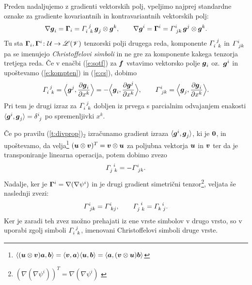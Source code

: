 Preden nadaljujemo z gradienti vektorskih polj, vpeljimo najprej standardne oznake
za gradiente kovariantnih in kontravariantnih vektorskih polj:
\begin{equation} \label{e:cs} %
	\nabla\vek{g}_i=\ten{\Gamma}_i=\cs{i}{j}{k}\,\vek{g}_j\otimes\vek{g}^k,\qquad
	\nabla\vek{g}^i=\ten{\Gamma}^i=\ks{i}{jk}\,\vek{g}^j\otimes\vek{g}^k.
\end{equation}
Tu sta $\mathbf \Gamma_i,\mathbf \Gamma^i\colon \mathcal U\to\mathscr L(\mathscr V)$ tenzorski polji drugega reda,
komponente $\cs{i}{j}{k}$ in $\ks{i}{jk}$ pa se imenujejo \emph{Christoffelovi simboli}
in ne gre za komponente kakega tenzorja tretjega reda. Če v enačbi (\ref{e:sotf})
za $\boldsymbol f$ vstavimo vektorsko polje $\boldsymbol g_i$ oz.~$\boldsymbol g^i$ in upoštevamo
(\ref{e:kompten}) in (\ref{e:cs}), dobimo
\begin{equation} \label{e:csexplicit}
	\cs{i}{j}{k}=\Big<\vek{g}^j,\frac{\partial\vek{g}_i}{\partial x^k}\Big>
	=-\Big<\vek{g}_i,\frac{\partial\vek{g}^j}{\partial x^k}\Big>,\qquad
	\ks{i}{jk}=\Big<\vek{g}_j,\frac{\partial\vek{g}_i}{\partial x^k}\Big>.
\end{equation}
Pri tem je drugi izraz za $\cs{i}{j}{k}$ dobljen iz prvega s parcialnim odvajanjem
enakosti $\langle\vek{g}^i,\vek{g}_j\rangle=\topbot{\delta}{i}{j}$ po spremenljivki $x^k$.

Če po pravilu (\ref{t:divprop})$_2$ izračunamo gradient izraza $\langle\boldsymbol g^i,\boldsymbol g_j\rangle$,
ki je $\boldsymbol 0$, in upoštevamo, da velja\footnote{
$\langle(\boldsymbol u\otimes\boldsymbol v)\boldsymbol a,\boldsymbol b\rangle=\langle\boldsymbol v,\boldsymbol a\rangle\langle\boldsymbol u,\boldsymbol b\rangle=
\langle\boldsymbol a,(\boldsymbol v\otimes\boldsymbol u)\boldsymbol b\rangle$}
$(\boldsymbol u\otimes\boldsymbol v)^{T}=\boldsymbol v\otimes\boldsymbol u$
za poljubna vektorja $\boldsymbol u$ in $\boldsymbol v$ ter da je transponiranje linearna operacija,
potem dobimo zvezo
\begin{equation} \label{e:lcs1}
	\cs{j}{i}{k}=-\ks{i}{jk}.
\end{equation}
Nadalje, ker je $\mathbf \Gamma^i=\nabla(\nabla\psi^i)$ in je drugi gradient
simetrični tenzor\footnote{$(\nabla(\nabla\psi^i))^T=\nabla(\nabla\psi^i)$ \cite[str.~271]{liu}},
veljata še naslednji zvezi:
\[ \ks{i}{jk}=\ks{i}{kj},\qquad\cs{j}{i}{k}=\cs{k}{i}{j}. \]
Ker je zaradi teh zvez možno prehajati iz ene vrste simbolov v drugo vrsto,
so v uporabi zgolj simboli $\cs{i}{j}{k}$, imenovani Christoffelovi simboli druge vrste.

